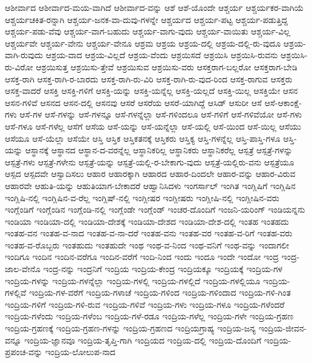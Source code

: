 {ಆಶೀರ್ವಾದ
ಆಶೀರ್ವಾದ-ಮಯ-ವಾಗಿದೆ
ಆಶೀರ್ವಾದ-ವನ್ನು
ಆಶೆ
ಆಶೆ-ಯೊಂದೇ
ಆಶ್ಚರ್ಯ
ಆಶ್ಚರ್ಯಕರ-ವಾಗಿಯೆ
ಆಶ್ಚರ್ಯಚಕಿತ-ರನ್ನಾಗಿ
ಆಶ್ಚರ್ಯ-ಜನಕ-ವಾ-ದುವು-ಗಳನ್ನೇ
ಆಶ್ಚರ್ಯದ
ಆಶ್ಚರ್ಯ-ಪಟ್ಟ
ಆಶ್ಚರ್ಯ-ಪಡುತ್ತಿದ್ದ
ಆಶ್ಚರ್ಯ-ಪಡು-ವೆವು
ಆಶ್ಚರ್ಯ-ವಾಗ-ಬಹುದು
ಆಶ್ಚರ್ಯ-ವಾಗು-ವುದು
ಆಶ್ಚರ್ಯ-ವಾಯಿತು
ಆಶ್ಚರ್ಯ-ವಿಲ್ಲ
ಆಶ್ಚರ್ಯವೇ
ಆಶ್ಚರ್ಯ-ವೇನು
ಆಶ್ಚರ್ಯ-ವೇನೂ
ಆಶ್ರಮ
ಆಶ್ರಯ
ಆಶ್ರಯ-ದಲ್ಲಿ
ಆಶ್ರಯ-ದಲ್ಲಿ-ರು-ವುದೂ
ಆಶ್ರಯ-ವಾಗಿ-ರುವುದು
ಆಶ್ರಯ-ವಾದ
ಆಶ್ರಯ-ವಿಲ್ಲದೆ
ಆಶ್ರಯ-ವೆಂದು
ಆಶ್ರಯಿಸದೆ
ಆಶ್ರಯಿಸಿ
ಆಶ್ರಯಿಸಿ-ರುವನು
ಆಶ್ರಯಿಸಿ-ರು-ವಿರೋ
ಆಶ್ರಯಿಸುತ್ತ
ಆಶ್ರಯಿಸು-ತ್ತೇವೆ
ಆಶ್ರಯಿಸುವ
ಆಶ್ರಯಿಸು-ವರು
ಆಸಕ್ತರಾಗ-ಬಲ್ಲರೋ
ಆಸಕ್ತರಾಗ-ಬೇಡಿ
ಆಸಕ್ತ-ರಾಗಿ
ಆಸಕ್ತ-ರಾಗಿ-ರ-ಬಾರದು
ಆಸಕ್ತ-ರಾಗಿ-ರು-ವಿರಿ
ಆಸಕ್ತ-ರಾಗಿ-ರು-ವುದ-ರಿಂದ
ಆಸಕ್ತ-ರಾಗುವ
ಆಸಕ್ತರು
ಆಸಕ್ತ-ವಾದರೆ
ಆಸಕ್ತಿ
ಆಸಕ್ತಿ-ಗಳಿಗೆ
ಆಸಕ್ತಿ-ಯನ್ನು
ಆಸಕ್ತಿ-ಯನ್ನೆಲ್ಲ
ಆಸಕ್ತಿ-ಯಲ್ಲದೆ
ಆಸಕ್ತಿ-ಯಿಲ್ಲ
ಆಸಕ್ತಿಯೇ
ಆಸನ
ಆಸನ-ಗಳಿವೆ
ಆಸನದ
ಆಸನ-ದಲ್ಲಿ
ಆಸನವು
ಆಸರೆ
ಆಸರೆಯ
ಆಸರೆ-ಯಾಗಿದ್ದೆ
ಆಸಿಡ್
ಆಸುರೀ
ಆಸೆ
ಆಸೆ-ಆಕಾಂಕ್ಷೆ-ಗಳು
ಆಸೆ-ಗಳ
ಆಸೆ-ಗಳನ್ನು
ಆಸೆ-ಗಳನ್ನೂ
ಆಸೆ-ಗಳನ್ನೆಲ್ಲಾ
ಆಸೆ-ಗಳಿಂದಲೂ
ಆಸೆ-ಗಳಿಗೆ
ಆಸೆ-ಗಳಿವೆಯೋ
ಆಸೆ-ಗಳು
ಆಸೆ-ಗಳೂ
ಆಸೆ-ಗಳೆಲ್ಲ
ಆಸೆಗೆ
ಆಸೆಯ
ಆಸೆ-ಯನ್ನು
ಆಸೆ-ಯನ್ನೆಲ್ಲಾ
ಆಸೆ-ಯಲ್ಲಿ
ಆಸೆ-ಯಿಂದ
ಆಸೆ-ಯಿಲ್ಲ
ಆಸೆಯು
ಆಸೆಯೂ
ಆಸೆ-ಯೆಲ್ಲಾ
ಆಸೆಯೇ
ಆಸ್ತಿ
ಆಸ್ತಿಕ
ಆಸ್ತಿಕತನಕ್ಕೆ
ಆಸ್ತಿಕರು
ಆಸ್ತಿಕ್ಯ
ಆಸ್ತಿ-ಗಳನ್ನೆಲ್ಲ
ಆಸ್ತಿ-ಪಾಸ್ತಿ-ಗಳೂ
ಆಸ್ತಿ-ಯನ್ನು
ಆಸ್ಥಾನಕ್ಕೆ
ಆಸ್ಥಾನದ
ಆಸ್ಥಾನ-ದ-ವರನ್ನೆಲ್ಲ
ಆಸ್ಥಾನಿಕರಿಲ್ಲ
ಆಸ್ಥಾನಿಕರು
ಆಸ್ಥಾನಿಕರೆಲ್ಲ
ಆಸ್ಪತ್ರೆ
ಆಸ್ಪತ್ರೆ-ಗಳನ್ನು
ಆಸ್ಪತ್ರೆ-ಗಳು
ಆಸ್ಪತ್ರೆ-ಗಳೇನು
ಆಸ್ಪತ್ರೆ-ಯನ್ನು
ಆಸ್ಪತ್ರೆ-ಯಲ್ಲಿ-ರ-ಬೇಕಾಗು-ವುದು
ಆಸ್ಪತ್ರೆ-ಯಲ್ಲಿರು-ವನು
ಆಸ್ಪತ್ರೆಯೂ
ಆಸ್ಪದ
ಆಸ್ಪದವೇ
ಆಸ್ವಾದಿಸಲು
ಆಹಾರ
ಆಹಾರಕ್ಕಾಗಿ
ಆಹಾರದ
ಆಹಾರ-ದಿಂದಲೇ
ಆಹಾರ-ವನ್ನು
ಆಹಾರ-ವಿರುವ
ಆಹಾರವೇ
ಆಹುತಿ-ಯನ್ನು
ಆಹುತಿಯಾಗ-ಬೇಕಾದರೆ
ಆಹ್ವಾನಿಸಿದಳು
ಇಂಗರ್ಸಾಲ್
ಇಂಗಿತ
ಇಂಗ್ಲಿಷಿಗೆ
ಇಂಗ್ಲಿಷಿನ
ಇಂಗ್ಲಿಷಿ-ನಲ್ಲಿ
ಇಂಗ್ಲಿಷಿನ-ವ-ರೆಲ್ಲ
ಇಂಗ್ಲಿಷ್-ನಲ್ಲಿ
ಇಂಗ್ಲೀಷರ
ಇಂಗ್ಲೀಷರು
ಇಂಗ್ಲೀಷಿ-ನಲ್ಲಿ
ಇಂಗ್ಲೀಷಿನ-ವರು
ಇಂಗ್ಲೆಂಡಿಗೆ
ಇಂಗ್ಲೆಂಡಿನ
ಇಂಗ್ಲೆಂಡಿ-ನಲ್ಲಿ
ಇಂಗ್ಲೆಂಡೇ
ಇಂಗ್ಲೆಂಡ್
ಇಂಚರ-ದೊಂದಿಗೆ
ಇಂಜನಿ-ಯರಿಂಗ್
ಇಂಡಿಯನ್ನನು
ಇಂಡಿಯಾ
ಇಂಡಿಯಾ-ದಲ್ಲಿ
ಇಂಡಿಯಾ-ದೇಶಕ್ಕೆ
ಇಂಡಿಯಾ-ದೇಶದ
ಇಂಡಿಯಾ-ದೇಶ-ದಲ್ಲಿ
ಇಂತಹ
ಇಂತಹದು
ಇಂತಹ-ವನ
ಇಂತಹ-ವ-ನಾದ
ಇಂತಹ-ವ-ನಾ-ದರೆ
ಇಂತಹ-ವನು
ಇಂತಹ-ವರ
ಇಂತಹ-ವ-ರಿಗೆ
ಇಂತಹ-ವರು
ಇಂತಹ-ವ-ರೊಬ್ಬರು
ಇಂತಹುದು
ಇಂತಹುದೇ
ಇಂಥ
ಇಂಥ-ವ-ನಿಂದ
ಇಂಥ-ವನಿಗೆ
ಇಂಥ-ವನ್ನು
ಇಂದಾಗಲೀ
ಇಂದಿಗೂ
ಇಂದಿನ
ಇಂದಿನ-ವರೆಗೂ
ಇಂದಿನ-ವರೆಗೆ
ಇಂದಿ-ನಿಂದ
ಇಂದು
ಇಂದೂ
ಇಂದೇ
ಇಂದೋ
ಇಂದ್ರ
ಇಂದ್ರ-ಜಾಲ-ವೇನೊ
ಇಂದ್ರ-ನನ್ನು
ಇಂದ್ರನಿಗೆ
ಇಂದ್ರಿಯ
ಇಂದ್ರಿಯ-ಕೇಂದ್ರ
ಇಂದ್ರಿಯಕ್ಕೂ
ಇಂದ್ರಿಯಕ್ಕೆ
ಇಂದ್ರಿಯ-ಗಳ
ಇಂದ್ರಿಯ-ಗಳನ್ನು
ಇಂದ್ರಿಯ-ಗಳನ್ನೆಲ್ಲಾ
ಇಂದ್ರಿಯ-ಗಳಲ್ಲಿ
ಇಂದ್ರಿಯ-ಗಳಲ್ಲಿದೆ
ಇಂದ್ರಿಯ-ಗಳಲ್ಲಿಯೂ
ಇಂದ್ರಿಯ-ಗಳಲ್ಲಿವೆ
ಇಂದ್ರಿಯ-ಗಳ-ವರೆಗೆ
ಇಂದ್ರಿಯ-ಗಳಾಚೆ
ಇಂದ್ರಿಯ-ಗಳಿಂದ
ಇಂದ್ರಿಯ-ಗಳಿಂದಾದ
ಇಂದ್ರಿಯ-ಗಳಿ-ಗಿಂತ
ಇಂದ್ರಿಯ-ಗಳಿಗೆ
ಇಂದ್ರಿಯ-ಗಳಿ-ರುವ
ಇಂದ್ರಿಯ-ಗಳಿವೆ
ಇಂದ್ರಿಯ-ಗಳು
ಇಂದ್ರಿಯ-ಗಳೂ
ಇಂದ್ರಿಯ-ಗಳೆಂದರೆ
ಇಂದ್ರಿಯ-ಗಳೆಂದು
ಇಂದ್ರಿಯ-ಗಳೆಂಬ
ಇಂದ್ರಿಯ-ಗಳೆ-ರಡೂ
ಇಂದ್ರಿಯ-ಗಳೆಲ್ಲ
ಇಂದ್ರಿಯ-ಗಳೇ
ಇಂದ್ರಿಯ-ಗ್ರಹಣ
ಇಂದ್ರಿಯ-ಗ್ರಹಣಕ್ಕೆ
ಇಂದ್ರಿಯ-ಗ್ರಹಣ-ಗಳನ್ನು
ಇಂದ್ರಿಯ-ಗ್ರಹಣದ
ಇಂದ್ರಿಯಗ್ರಾಹ್ಯ
ಇಂದ್ರಿಯ-ಜನ್ಯ
ಇಂದ್ರಿಯ-ಜೀವನ-ವನ್ನೂ
ಇಂದ್ರಿಯ-ಜ್ಞಾನವೂ
ಇಂದ್ರಿಯ-ತೃಪ್ತಿ-ಗಾಗಿ
ಇಂದ್ರಿಯದ
ಇಂದ್ರಿಯ-ದಲ್ಲಿ
ಇಂದ್ರಿಯ-ದೊಂದಿಗೆ
ಇಂದ್ರಿಯ-ಪ್ರಪಂಚ-ವನ್ನು
ಇಂದ್ರಿಯ-ಲೋಲುಪ-ನಾದ
}
